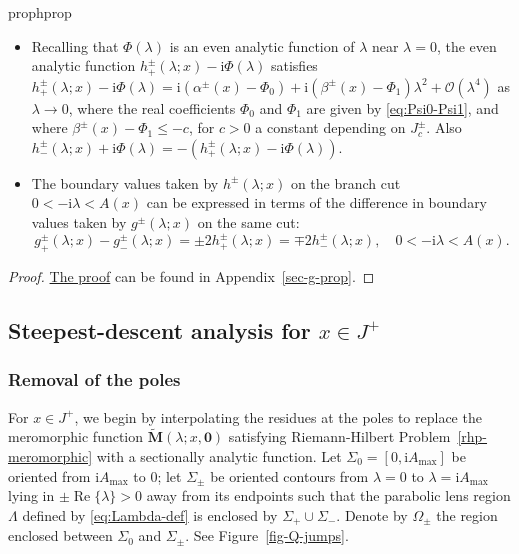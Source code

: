 \documentclass[12pt]{amsart}
\numberwithin{equation}{section}
\newcommand{\ii}{\mathrm{i}}
\newcommand{\SP}{\lambda}
\newcommand{\phaseint}{\Phi}
\newcommand{\bigo}[1]{ \mathcal{O}\! \left( #1 \right) }
\renewcommand{\Re}{\operatorname{Re}}
\begin{document}
\begin{restatable}{prop}{hprop}
\begin{itemize}
\item[H5:] Recalling that $\phaseint(\SP)$ is an even analytic function of $\SP$ near $\SP=0$, the even analytic function $h^\pm_+(\SP;x)-\ii\phaseint(\SP)$ satisfies $h^\pm_+(\SP;x)-\ii\phaseint(\SP)= \ii(\alpha^\pm(x)-\phaseint_0) +\ii(\beta^\pm(x)-\phaseint_1)\SP^2 + \bigo{\SP^4}$ as $\SP\to 0$, where the real coefficients $\phaseint_0$ and $\phaseint_1$ are given by \eqref{eq:Psi0-Psi1}, and where $\beta^\pm(x)-\phaseint_1\leq - c$, for $c > 0$ a constant depending on $J_c^\pm$.  Also $h^\pm_-(\SP;x)+\ii\phaseint(\SP)=-(h^\pm_+(\SP;x)-\ii\phaseint(\SP))$.
\item[H6:] 
The boundary values taken by $h^\pm(\SP;x)$ on the branch cut $0<-\ii\SP<A(x)$ can be expressed in terms of the difference in boundary values taken by $g^\pm(\SP;x)$ on the same cut:
\begin{equation}
g^\pm_+(\SP;x)-g^\pm_-(\SP;x)=\pm 2h_+^\pm(\SP;x) = \mp 2h_-^\pm(\SP;x),\quad 0<-\ii\SP<A(x).
\label{eq:gdiff-h}
\end{equation}
\end{itemize}
\label{prop:h-properties}
\end{restatable}

\begin{proof}
\hyperlink{proof-h-prop}{The proof} can be found in Appendix~\ref{sec-g-prop}.
\end{proof}



\subsection{Steepest-descent analysis for $x \in J^+$}
\label{sec-steepest-descent}
\noindent

\subsubsection{Removal of the poles}
For $x \in J^+$, we begin by interpolating the residues at the poles to replace the meromorphic function $\widetilde{\mathbf{M}}(\SP;x,\mathbf{0})$ satisfying Riemann-Hilbert Problem~\ref{rhp-meromorphic} with a sectionally analytic function.  Let $\Sigma_0 = [0, \ii A_\text{max}]$ be oriented from $\ii A_\text{max}$ to $0$; 
let $\Sigma_\pm$ be oriented contours from $\SP = 0$ to $\SP = \ii A_\text{max}$ lying in $\pm\Re\{\SP \}> 0 $ away from its endpoints such that the parabolic lens region $\Lambda$ defined by \eqref{eq:Lambda-def} is enclosed by $\Sigma_+ \cup \Sigma_-$.  
Denote by $\Omega_\pm$ the region enclosed between $\Sigma_0$ and $\Sigma_\pm$. 
See Figure~\ref{fig-Q-jumps}.
\end{document}
